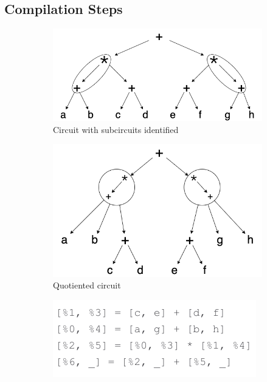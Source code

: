 \subsection{Compilation Steps}
\begin{figure}
    \begin{subfigure}{0.45\columnwidth}
        \includegraphics[width=0.9\linewidth]{figures/compilation_overview/running_example_quotiented.drawio.png}
        \caption{Circuit with subcircuits identified}
        \label{fig:subcircuits-identified}
    \end{subfigure}
    \begin{subfigure}{0.45\columnwidth}
        \includegraphics[width=0.9\linewidth]{figures/compilation_overview/running_example_identified.drawio.png}
        \caption{Quotiented circuit}
        \label{fig:quotiented-circuit}
    \end{subfigure}
    \begin{subfigure}{0.55\columnwidth}
        \centering
        \includegraphics[width=0.9\linewidth]{figures/compilation_overview/aligned_schedule.drawio.pdf}

\end{subfigure}
\end{figure}
